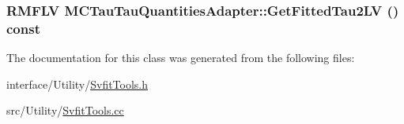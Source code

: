 \label{classMCTauTauQuantitiesAdapter_a1a918c40f13d7999f349eb43b4613697}
\hypertarget{classMCTauTauQuantitiesAdapter_a209e28e3951092eb515b0111f0ef29fc}{
\subsubsection[{GetFittedTau2LV}]{\setlength{\rightskip}{0pt plus 5cm}RMFLV MCTauTauQuantitiesAdapter::GetFittedTau2LV () const}}
\label{classMCTauTauQuantitiesAdapter_a209e28e3951092eb515b0111f0ef29fc}


The documentation for this class was generated from the following files:\begin{DoxyCompactItemize}
\item 
interface/Utility/\hyperlink{SvfitTools_8h}{SvfitTools.h}\item 
src/Utility/\hyperlink{SvfitTools_8cc}{SvfitTools.cc}\end{DoxyCompactItemize}
